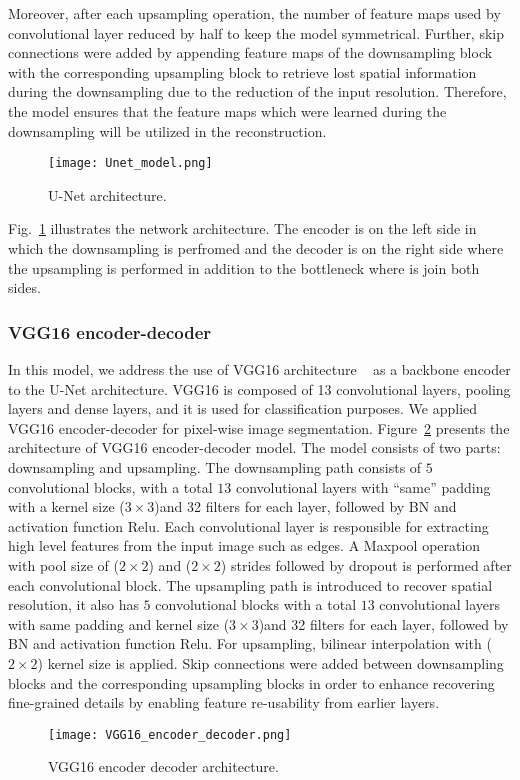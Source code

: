 Moreover, after each upsampling operation, the number of feature maps used by convolutional layer reduced by half to keep the model symmetrical. 
Further, skip connections were added by appending feature maps of the downsampling block with the corresponding upsampling block to retrieve lost spatial information during the downsampling due to the reduction of the input resolution.
Therefore, the model ensures that the feature maps which were learned during the downsampling will be utilized in the reconstruction. 
\begin{figure} [h!]
	\begin{center}
		\texttt{[image: Unet\_model.png]}
	\end{center}
	\caption{U-Net architecture.} 
	\label{fig:Unet}
\end{figure}
Fig.~\ref{fig:Unet}  illustrates the network architecture. 
The encoder is on the left side in which the downsampling is perfromed and the decoder is on the right side where the upsampling is performed in addition to the bottleneck where is join both sides.
\subsubsection{VGG16 encoder-decoder}
In this model, we address the use of VGG16 architecture  ~\cite{simonyan2014very} as a backbone encoder to the U-Net architecture.
VGG16 is composed of 13 convolutional layers, pooling layers and dense layers, and it is used for classification purposes. 
We applied VGG16 encoder-decoder for pixel-wise image segmentation.
Figure~\ref{vgg16} presents the architecture of VGG16 encoder-decoder model. 
The model consists of two parts: downsampling and upsampling.
The downsampling path consists of \(5\) convolutional blocks,  with a total \(13\) convolutional layers  with \enquote{same} padding with a kernel size (\(3\times3\))and 32 filters for each layer, followed by BN and activation function Relu.
Each convolutional layer is responsible for extracting high level features from the input image such as edges.
A Maxpool operation with pool size of (\(2\times2\))  and (\(2\times2\)) strides followed by dropout is performed after each convolutional block. 
The upsampling path is introduced to recover spatial resolution, it also has \(5\) convolutional blocks with a total \(13\) convolutional layers  with same padding and kernel size (\(3\times3\))and 32 filters for each layer, followed by BN and activation function Relu.
For upsampling, bilinear interpolation with (\(2\times2\)) kernel size is applied.
Skip connections were added between downsampling blocks and the corresponding upsampling blocks in order to enhance recovering fine-grained details by enabling feature re-usability from earlier layers.
\begin{figure} [h!]
	\begin{center}
		\texttt{[image: VGG16\_encoder\_decoder.png]}
	\end{center}
	\caption{VGG16 encoder decoder architecture.} 
	\label{vgg16}
\end{figure}
